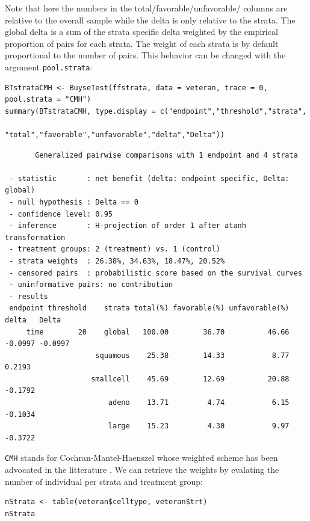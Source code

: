 \documentclass[12pt]{article}
\begin{document}
Note that here the numbers in the total/favorable/unfavorable/ columns
are relative to the overall sample while the delta is only relative to
the strata. The global delta is a sum of the strata specific delta
weighted by the empirical proportion of pairs for each strata. The
weight of each strata is by default proportional to the number of
pairs. This behavior can be changed with the argument \texttt{pool.strata}:

\lstset{language=r,label= ,caption= ,captionpos=b,numbers=none}
\begin{lstlisting}
BTstrataCMH <- BuyseTest(ffstrata, data = veteran, trace = 0, pool.strata = "CMH")
summary(BTstrataCMH, type.display = c("endpoint","threshold","strata",
                                      "total","favorable","unfavorable","delta","Delta"))
\end{lstlisting}

\begin{verbatim}
       Generalized pairwise comparisons with 1 endpoint and 4 strata

 - statistic       : net benefit (delta: endpoint specific, Delta: global) 
 - null hypothesis : Delta == 0 
 - confidence level: 0.95 
 - inference       : H-projection of order 1 after atanh transformation 
 - treatment groups: 2 (treatment) vs. 1 (control) 
 - strata weights  : 26.38%, 34.63%, 18.47%, 20.52% 
 - censored pairs  : probabilistic score based on the survival curves
 - uninformative pairs: no contribution
 - results
 endpoint threshold    strata total(%) favorable(%) unfavorable(%)   delta   Delta
     time        20    global   100.00        36.70          46.66 -0.0997 -0.0997
                     squamous    25.38        14.33           8.77  0.2193        
                    smallcell    45.69        12.69          20.88 -0.1792        
                        adeno    13.71         4.74           6.15 -0.1034        
                        large    15.23         4.30           9.97 -0.3722
\end{verbatim}

\texttt{CMH} stands for Cochran-Mantel-Haenszel whose weighted scheme has
been advocated in the litterature \citep{dong2018stratified}. We can
retrieve the weights by evalating the number of individual per strata
and treatment group:
\lstset{language=r,label= ,caption= ,captionpos=b,numbers=none}
\begin{lstlisting}
nStrata <- table(veteran$celltype, veteran$trt)
nStrata
\end{lstlisting}
\end{document}
